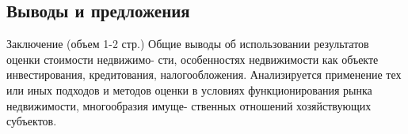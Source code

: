 \subsection*{Выводы и предложения}
Заключение (объем 1-2 стр.)
Общие выводы об использовании результатов оценки стоимости недвижимо-
сти, особенностях недвижимости как объекте инвестирования, кредитования,
налогообложения. Анализируется применение тех или иных подходов и методов
оценки в условиях функционирования рынка недвижимости, многообразия имуще-
ственных отношений хозяйствующих субъектов.